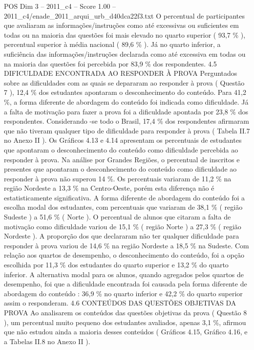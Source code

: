 \begin{textsample}{POS Dim 3 – 2011\_c4 – Score 1.00 – 2011\_c4/enade\_2011\_arqui\_urb\_d40dca22f3.txt}
O percentual de participantes que avaliaram as informações/instruções como até excessivas ou suficientes em todas ou na maioria das questões foi mais elevado no quarto superior ( 93,7 \% ), percentual superior à média nacional ( 89,6 \% ).
Já no quarto inferior, a suficiência das informações/instruções declarada como até excessiva em todas ou na maioria das questões foi percebida por 83,9 \% dos respondentes. 4.5 DIFICULDADE ENCONTRADA AO RESPONDER À PROVA Perguntados sobre as dificuldades com as quais se depararam ao responder à prova ( Questão 7 ), 12,4 \% dos estudantes apontaram o desconhecimento do conteúdo.
Para 41,2 \%, a forma diferente de abordagem do conteúdo foi indicada como dificuldade.
Já a falta de motivação para fazer a prova foi a dificuldade apontada por 23,8 \% dos respondentes.
Considerando -se todo o Brasil, 17,4 \% dos respondentes afirmaram que não tiveram qualquer tipo de dificuldade para responder à prova ( Tabela II.7 no Anexo II ).
Os Gráficos 4.13 e 4.14 apresentam os percentuais de estudantes que apontaram o desconhecimento do conteúdo como dificuldade percebida ao responder à prova.
Na análise por Grandes Regiões, o percentual de inscritos e presentes que apontaram o desconhecimento do conteúdo como dificuldade ao responder à prova não superou 14 \%.
Os percentuais variaram de 11,2 \% na região Nordeste a 13,3 \% na Centro-Oeste, porém esta diferença não é estatisticamente significativa.
A forma diferente de abordagem do conteúdo foi a escolha modal dos estudantes, com percentuais que variaram de 38,1 \% ( região Sudeste ) a 51,6 \% ( Norte ).
O percentual de alunos que citaram a falta de motivação como dificuldade variou de 15,1 \% ( região Norte ) a 27,3 \% ( região Nordeste ).
A proporção dos que declararam não ter qualquer dificuldade para responder à prova variou de 14,6 \% na região Nordeste a 18,5 \% na Sudeste.
Com relação aos quartos de desempenho, o desconhecimento do conteúdo, foi a opção escolhida por 11,3 \% dos estudantes do quarto superior e 13,2 \% do quarto inferior.
A alternativa modal para os alunos, quando agregados pelos quartos de desempenho, foi que a dificuldade encontrada foi causada pela forma diferente de abordagem do conteúdo : 36,9 \% no quarto inferior e 42,2 \% do quarto superior assim o responderam. 4.6 CONTEÚDOS DAS QUESTÕES OBJETIVAS DA PROVA Ao analisarem os conteúdos das questões objetivas da prova ( Questão 8 ), um percentual muito pequeno dos estudantes avaliados, apenas 3,1 \%, afirmou que não estudou ainda a maioria desses conteúdos ( Gráficos 4.15, Gráfico 4.16, e a Tabelas II.8 no Anexo II ).

\end{textsample}
